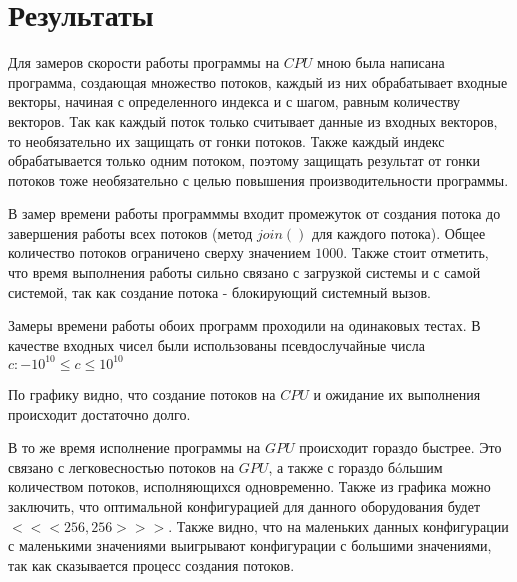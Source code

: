 \section{Результаты}
Для замеров скорости работы программы на $CPU$ мною была написана программа, создающая множество потоков, каждый из них обрабатывает входные векторы, начиная с определенного индекса и с шагом, равным количеству векторов.
Так как каждый поток только считывает данные из входных векторов, то необязательно их защищать от гонки потоков. Также каждый индекс обрабатывается только одним потоком, поэтому защищать результат от гонки потоков тоже необязательно с целью повышения производительности программы.

В замер времени работы программмы входит промежуток от создания потока до завершения работы всех потоков (метод $join()$ для каждого потока). Общее количество потоков ограничено сверху значением $1000$. Также стоит отметить, что время выполнения работы сильно связано с загрузкой системы и с самой системой, так как создание потока - блокирующий системный вызов.

Замеры времени работы обоих программ проходили на одинаковых тестах. В качестве входных чисел были использованы псевдослучайные числа $c: -10^{10} \leq c \leq 10^{10}$


По графику видно, что создание потоков на $CPU$ и ожидание их выполнения происходит достаточно долго.


В то же время исполнение программы на $GPU$ происходит гораздо быстрее. Это связано с легковесностью потоков на $GPU$, а также с гораздо б\'oльшим количеством потоков, исполняющихся одновременно.
Также из графика можно заключить, что оптимальной конфигурацией для данного оборудования будет $<<< 256, 256 >>>$. Также видно, что на маленьких данных конфигурации с маленькими значениями выигрывают конфигурации с большими значениями, так как сказывается процесс создания потоков.